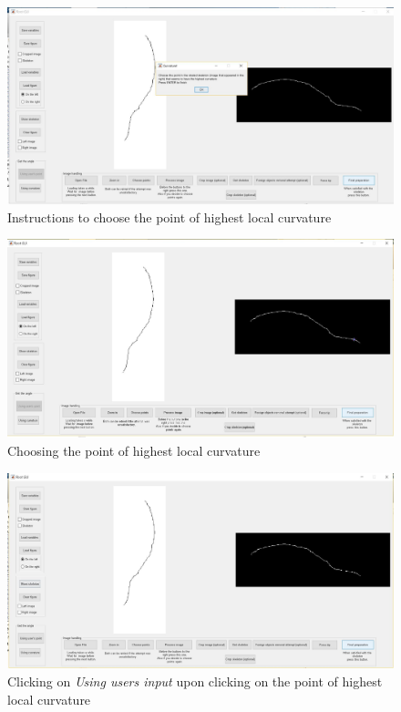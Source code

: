 \begin{figure}[H]
	\centering
	\includegraphics[width=\textwidth]{../Figures/manual/optionalE3.jpg}
	\caption{Instructions to choose the point of highest local curvature}
	\label{fig:img64}
\end{figure}

\begin{figure}[H]
	\centering
	\includegraphics[width=\textwidth]{../Figures/manual/optionalE4.jpg}
	\caption{Choosing the point of highest local curvature}
	\label{fig:img65}
\end{figure}

\begin{figure}[H]
	\centering
	\includegraphics[width=\textwidth]{../Figures/manual/optionalE5.jpg}
	\caption{Clicking on \textit{Using users input} upon clicking on the point of highest local curvature}
	\label{fig:img66}
\end{figure}

